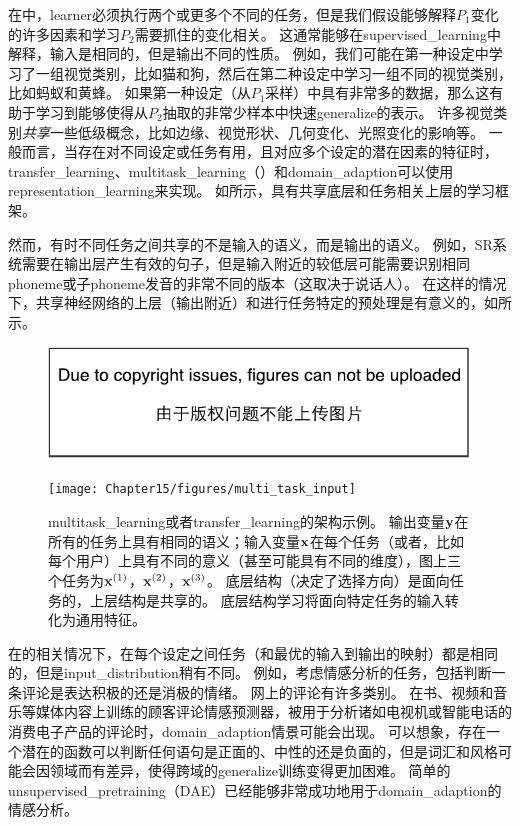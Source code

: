 在中，\gls{learner}必须执行两个或更多个不同的任务，但是我们假设能够解释$P_1$变化的许多因素和学习$P_2$需要抓住的变化相关。
这通常能够在\gls{supervised_learning}中解释，输入是相同的，但是输出不同的性质。
例如，我们可能在第一种设定中学习了一组视觉类别，比如猫和狗，然后在第二种设定中学习一组不同的视觉类别，比如蚂蚁和黄蜂。
如果第一种设定（从$P_1$采样）中具有非常多的数据，那么这有助于学习到能够使得从$P_2$抽取的非常少样本中快速\gls{generalize}的表示。%
许多视觉类别\emph{共享}一些低级概念，比如边缘、视觉形状、几何变化、光照变化的影响等。
一般而言，当存在对不同设定或任务有用，且对应多个设定的潜在因素的特征时，\gls{transfer_learning}、\gls{multitask_learning}（）和\gls{domain_adaption}可以使用\gls{representation_learning}来实现。
如所示，具有共享底层和任务相关上层的学习框架。


然而，有时不同任务之间共享的不是输入的语义，而是输出的语义。
例如，\gls{SR}系统需要在输出层产生有效的句子，但是输入附近的较低层可能需要识别相同\gls{phoneme}或子\gls{phoneme}发音的非常不同的版本（这取决于说话人）。
在这样的情况下，共享神经网络的上层（输出附近）和进行任务特定的预处理是有意义的，如所示。



\begin{figure}[!htb]
\ifOpenSource
\centerline{\includegraphics{figure.pdf}}
\else
\centerline{\texttt{[image: Chapter15/figures/multi\_task\_input]}}
\fi
\caption{\gls{multitask_learning}或者\gls{transfer_learning}的架构示例。
输出变量$\mathbf{y}$在所有的任务上具有相同的语义；输入变量$\mathbf{x}$在每个任务（或者，比如每个用户）上具有不同的意义（甚至可能具有不同的维度），图上三个任务为$\mathbf{x}^{(1)}$，$\mathbf{x}^{(2)}$，$\mathbf{x}^{(3)}$。
底层结构（决定了选择方向）是面向任务的，上层结构是共享的。
底层结构学习将面向特定任务的输入转化为通用特征。
}
\label{fig:chap15_multi_task_input}
\end{figure}


在的相关情况下，在每个设定之间任务（和最优的输入到输出的映射）都是相同的，但是\gls{input_distribution}稍有不同。 
例如，考虑情感分析的任务，包括判断一条评论是表达积极的还是消极的情绪。 
网上的评论有许多类别。
在书、视频和音乐等媒体内容上训练的顾客评论情感预测器，被用于分析诸如电视机或智能电话的消费电子产品的评论时，\gls{domain_adaption}情景可能会出现。%
可以想象，存在一个潜在的函数可以判断任何语句是正面的、中性的还是负面的，但是词汇和风格可能会因领域而有差异，使得跨域的\gls{generalize}训练变得更加困难。
简单的\gls{unsupervised_pretraining}（\gls{DAE}）已经能够非常成功地用于\gls{domain_adaption}的情感分析\citep{Glorot+al-ICML-2011}。

